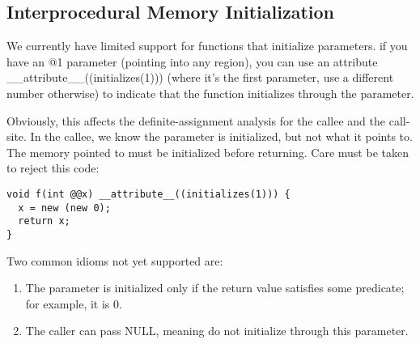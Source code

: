 \subsection{Interprocedural Memory Initialization}

We currently have limited support for functions that initialize
parameters.  if you have an @{1} parameter (pointing into any region),
you can use an attribute __attribute__((initializes(1))) (where it's
the first parameter, use a different number otherwise) to indicate
that the function initializes through the parameter.
        
Obviously, this affects the definite-assignment analysis for the
callee and the call-site.  In the callee, we know the parameter is
initialized, but not what it points to.  The memory pointed to must be
initialized before returning.  Care must be taken to reject this code:
\begin{verbatim}
void f(int @@x) __attribute__((initializes(1))) { 
  x = new (new 0); 
  return x; 
}
\end{verbatim}
        
Two common idioms not yet supported are: 
\begin{enumerate}
\item The parameter is
initialized only if the return value satisfies some predicate; for
example, it is 0.
\item The caller can pass NULL, meaning do not initialize through this
  parameter.
\end{enumerate}
